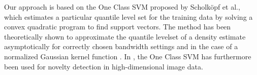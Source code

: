 \documentclass[10pt, conference]{ieeeconf}      %
\begin{document}
Our approach is based on the One Class SVM proposed by Scholk{\"o}pf et al., which estimates a particular quantile level set for the training data by solving a convex quadratic program  to find support
vectors. The method has been theoretically shown to approximate the quantile levelset of a density estimate
asymptotically for correctly chosen bandwidth settings and in the case of a normalized Gaussian kernel function \cite{vert2006consistency}. 
In \cite{liu2014unsupervised}, the One Class SVM has furthermore been used for novelty detection in high-dimensional 
image data.


\end{document}
